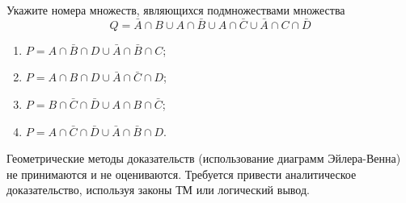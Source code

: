 \question
Укажите номера множеств, являющихся подмножествами множества
\begin{equation*}
	Q = \bar{A} \cap B \cup A \cap \bar{B} \cup A \cap \bar{C} \cup \bar{A} \cap C \cap \bar{D}
\end{equation*}

\begin{enumerate}
	\renewcommand{\labelenumi}{\arabic{enumi})}
	\item $P = A \cap \bar{B} \cap D \cup \bar{A} \cap \bar{B} \cap C$;
	\item $P = A \cap B \cap D \cup \bar{A} \cap \bar{C} \cap D$;
	\item $P = B \cap \bar{C} \cap \bar{D} \cup A \cap B \cap \bar{C}$;
	\item $P = A \cap \bar{C} \cap \bar{D} \cup \bar{A} \cap \bar{B} \cap D$.
\end{enumerate}

Геометрические методы доказательств (использование диаграмм Эйлера-Венна) не принимаются и не оцениваются. Требуется привести аналитическое доказательство, используя законы ТМ или логический вывод.
